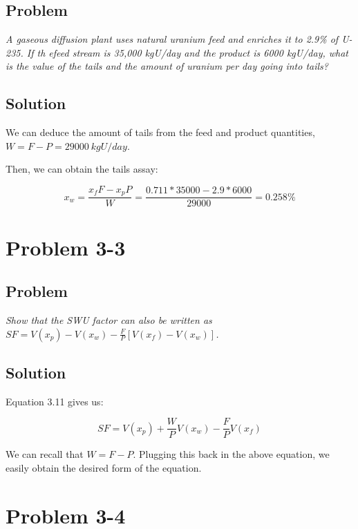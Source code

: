 \subsection{Problem}
\textit{A gaseous diffusion plant uses natural uranium feed and enriches it to 2.9\% of U-235. If th efeed stream is 35,000 kgU/day and the product is 6000 kgU/day, what is the value of the tails and the amount of uranium per day going into tails?}

\subsection{Solution}

We can deduce the amount of tails from the feed and product quantities, $W = F-P = 29000\ kgU/day$.

Then, we can obtain the tails assay:


\begin{equation}
x_w = \frac{x_fF - x_pP}{W} = \frac{0.711*35000-2.9*6000}{29000} = 0.258\%
\end{equation}


\section{Problem 3-3}
\label{prob33}

\subsection{Problem}
\textit{Show that the SWU factor can also be written as $SF = V(x_p) - V(x_w) - \frac{F}{P}\left[V(x_f)-V(x_w)\right]$.}

\subsection{Solution}


Equation 3.11 gives us:

\begin{equation}
SF = V(x_p) + \frac{W}{P}V(x_w) - \frac{F}{P}V(x_f)
\end{equation}

We can recall that $W = F-P$. Plugging this back in the above equation, we easily obtain the desired form of the equation.


\section{Problem 3-4}
\label{prob34}

